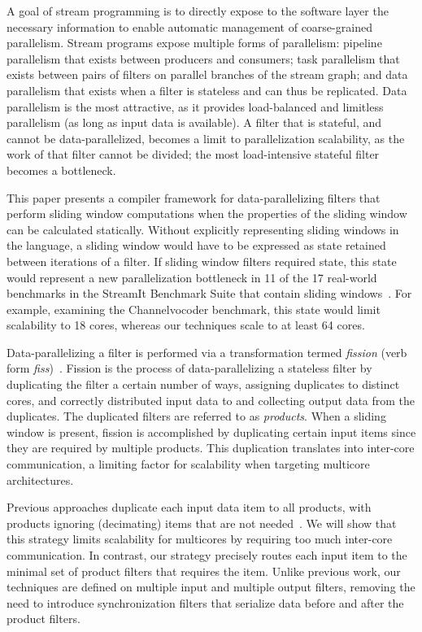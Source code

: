 A goal of stream programming is to directly expose to the software
layer the necessary information to enable automatic management of
coarse-grained parallelism.  Stream programs expose multiple forms of
parallelism: pipeline parallelism that exists between producers and
consumers; task parallelism that exists between pairs of filters on
parallel branches of the stream graph; and data parallelism that
exists when a filter is stateless and can thus be replicated.  Data
parallelism is the most attractive, as it provides load-balanced and
limitless parallelism (as long as input data is available).  A filter
that is stateful, and cannot be data-parallelized, becomes a limit to
parallelization scalability, as the work of that filter cannot be
divided; the most load-intensive stateful filter becomes a
bottleneck.

This paper presents a compiler framework for data-parallelizing
filters that perform sliding window computations when the properties
of the sliding window can be calculated statically.   Without explicitly
representing sliding windows in the language, a sliding window would
have to be expressed as state retained between iterations of a
filter.  If sliding window filters required state, this state would
represent a new parallelization bottleneck in 11 of the
17 real-world benchmarks in the StreamIt Benchmark Suite 
that contain sliding windows~\cite{streamit-suite}.  For example, 
examining the Channelvocoder benchmark, this state would limit scalability to
18 cores, whereas our techniques scale to at least 64 cores.

Data-parallelizing a filter is performed via a transformation termed
{\it fission} (verb form {\it fiss})~\cite{streamit-asplos}.  Fission
is the process of data-parallelizing a stateless filter by duplicating
the filter a certain number of ways, assigning duplicates to distinct
cores, and correctly distributed input data to and collecting output
data from the duplicates.  The duplicated filters are referred to as
{\it products}.  When a sliding window is present, fission is
accomplished by duplicating certain input items since they are
required by multiple products.  This duplication translates into
inter-core communication, a limiting factor for scalability when
targeting multicore architectures.

Previous approaches duplicate each input data item to all products,
with products ignoring (decimating) items that are not
needed~\cite{streamit-asplos}.  We will show that this strategy limits
scalability for multicores by requiring too much inter-core
communication.  In contrast, our strategy precisely routes each input
item to the minimal set of product filters that requires the item.
Unlike previous work, our techniques are defined on
multiple input and multiple output filters, removing the need to
introduce synchronization filters that serialize data before and
after the product filters.  

